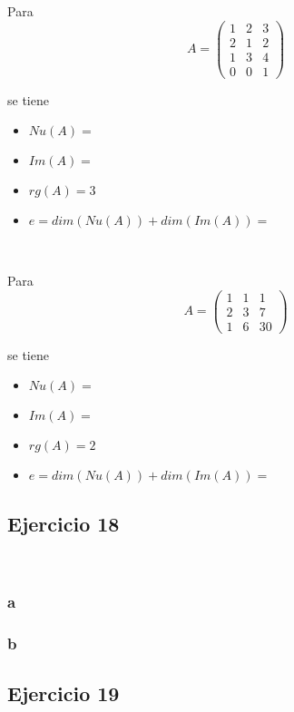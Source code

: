 \documentclass{article}
\begin{document}
Para \[A = \begin{pmatrix}
    1 & 2 & 3 \\
    2 & 1 & 2 \\
    1 & 3 & 4 \\
    0 & 0 & 1
\end{pmatrix}\]

\noindent se tiene 

\begin{itemize}
    \item $Nu(A) = $ 
    \item $Im(A) = $ 
    \item $rg(A) = 3$
    \item $e = dim(Nu(A)) + dim(Im(A)) = $  
\end{itemize}

\

\noindent Para \[A = \begin{pmatrix}
    1 & 1 & 1 \\
    2 & 3 & 7 \\
    1 & 6 & 30
\end{pmatrix}\]

\noindent se tiene 

\begin{itemize}
    \item $Nu(A) = $ 
    \item $Im(A) = $ 
    \item $rg(A) = 2$
    \item $e = dim(Nu(A)) + dim(Im(A)) = $  
\end{itemize}

\subsection*{Ejercicio 18}

\

\subsubsection*{a}

\subsubsection*{b}

\subsection*{Ejercicio 19}
\end{document}
